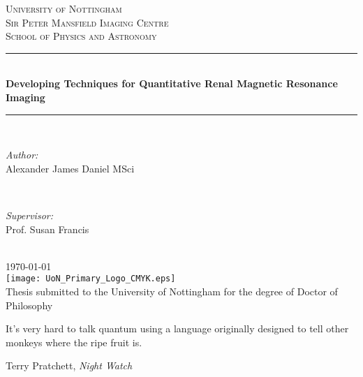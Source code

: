 \documentclass[12pt,a4paper,oneside]{report}
\author{Alexander James Daniel}
\makeatletter
\newcommand\blankpage{
    \null
    \thispagestyle{empty}
    \addtocounter{page}{-1}
    \newpage}
\renewenvironment{abstract}{
	\if@twocolumn
	\section*{\abstractname}
	\else
	\small
	\begin{center}
		{\bfseries \abstractname\vspace{-.5em}\vspace{\z@}}%
	\end{center}
	\quotation
	\fi}
{\if@twocolumn\else\endquotation\fi}
\makeatother
\begin{document}
{
\begin{titlepage}
\newcommand{\HRule}{\rule{\linewidth}{0.5mm}}
\center
 
\textsc{\LARGE University of Nottingham}\\[0.5cm]
\textsc{\Large Sir Peter Mansfield Imaging Centre}\\[0.5cm]
\textsc{\large School of Physics and Astronomy}\\[0.5cm]

\HRule \\[0.4cm]
{ \Large \bfseries Developing Techniques for Quantitative Renal Magnetic Resonance Imaging}\\[0.2cm]
\HRule \\[1.5cm]

\begin{minipage}{0.4\textwidth}
\begin{flushleft} \large
\emph{Author:}\\
Alexander James Daniel MSci
\end{flushleft}
\end{minipage}
~
\begin{minipage}{0.4\textwidth}
\begin{flushright} \large
\emph{Supervisor:} \\
Prof. Susan Francis
\end{flushright}
\end{minipage}\\[4cm]
{\large \today}\\[2cm]

\texttt{[image: UoN\_Primary\_Logo\_CMYK.eps]}\\[1cm]
Thesis submitted to the University of Nottingham for the degree of Doctor of Philosophy
\vfill
\end{titlepage}
}
\pagestyle{plain}

\vspace*{200px}

\epigraph{\large{It’s very hard to talk quantum using a language originally designed to tell other monkeys where the ripe fruit is.}}{\normalsize{Terry Pratchett, \textit{Night Watch}}}
\newpage

\begin{abstract}
	
\end{abstract}
\acresetall
\setcounter{tocdepth}{2}
\end{document}
